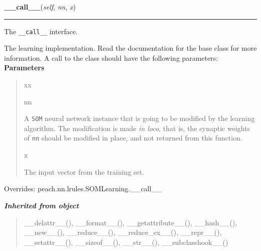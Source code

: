     \vspace{0.5ex}

\hspace{.8\funcindent}\begin{boxedminipage}{\funcwidth}

    \raggedright \textbf{\_\_call\_\_}(\textit{self}, \textit{nn}, \textit{x})

    \vspace{-1.5ex}

    \rule{\textwidth}{0.5\fboxrule}
\setlength{\parskip}{2ex}

The \texttt{\_\_call\_\_} interface.

The learning implementation. Read the documentation for the base class
for more information. A call to the class should have the following
parameters:
\setlength{\parskip}{1ex}
      \textbf{Parameters}
      \vspace{-1ex}

      \begin{quote}
        \begin{Ventry}{xx}

          \item[nn]


A \texttt{SOM} neural network instance that is going to be modified by
the learning algorithm. The modification is made \emph{in loco}, that is,
the synaptic weights of \texttt{nn} should be modified in place, and not
returned from this function.
          \item[x]


The input vector from the training set.
        \end{Ventry}

      \end{quote}

      Overrides: peach.nn.lrules.SOMLearning.\_\_call\_\_

    \end{boxedminipage}


\large{\textbf{\textit{Inherited from object}}}

\begin{quote}
\_\_delattr\_\_(), \_\_format\_\_(), \_\_getattribute\_\_(), \_\_hash\_\_(), \_\_new\_\_(), \_\_reduce\_\_(), \_\_reduce\_ex\_\_(), \_\_repr\_\_(), \_\_setattr\_\_(), \_\_sizeof\_\_(), \_\_str\_\_(), \_\_subclasshook\_\_()
\end{quote}


